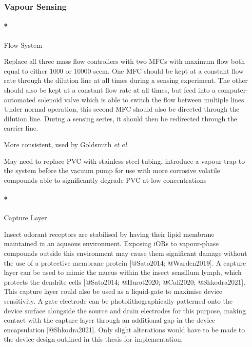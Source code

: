\documentclass[
  letterpaper,
  DIV=11,
  numbers=noendperiod]{scrartcl}
\let\oldparagraph\paragraph
\renewcommand{\paragraph}[1]{\oldparagraph{#1}\mbox{}}
\begin{document}
\hypertarget{sec-future-work-vapour}{%
\subsubsection{Vapour Sensing}\label{sec-future-work-vapour}}

\hypertarget{flow-system}{%
\paragraph*{Flow System}\label{flow-system}}

Replace all three mass flow controllers with two MFCs with maximum flow
both equal to either 1000 or 10000 sccm. One MFC should be kept at a
constant flow rate through the dilution line at all times during a
sensing experiment. The other should also be kept at a constant flow
rate at all times, but feed into a computer-automated solenoid valve
which is able to switch the flow between multiple lines. Under normal
operation, this second MFC should also be directed through the dilution
line. During a sensing series, it should then be redirected through the
carrier line.

More consistent, used by Goldsmith \emph{et al.}

May need to replace PVC with stainless steel tubing, introduce a vapour
trap to the system before the vacuum pump for use with more corrosive
volatile compounds able to significantly degrade PVC at low
concentrations

\hypertarget{capture-layer}{%
\paragraph*{Capture Layer}\label{capture-layer}}

Insect odorant receptors are stabilised by having their lipid membrane
maintained in an aqueous environment. Exposing iORs to vapour-phase
compounds outside this environment may cause them significant damage
without the use of a protective membrane protein {[}@Sato2014;
@Warden2019{]}. A capture layer can be used to mimic the mucus within
the insect sensillum lymph, which protects the dendrite cells
{[}@Sato2014; @Hurot2020; @Cali2020; @Shkodra2021{]}. This capture layer
could also be used as a liquid-gate to maximise device sensitivity. A
gate electrode can be photolithographically patterned onto the device
surface alongside the source and drain electrodes for this purpose,
making contact with the capture layer through an additional gap in the
device encapsulation {[}@Shkodra2021{]}. Only slight alterations would
have to be made to the device design outlined in this thesis for
implementation.
\end{document}
